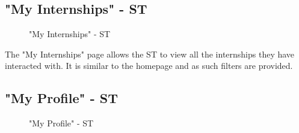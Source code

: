 \subsection{"My Internships" - ST}
\label{subsec:my-internships-st}%

\begin{figure}[H]
    \centering
    \caption{"My Internships" - ST}
    \label{fig:my-internships-st}
\end{figure}

\par The "My Internships" page allows the ST to view all the internships they have interacted with. It is similar to
the homepage and as such filters are provided.

\subsection{"My Profile" - ST}
\label{subsec:profile-st}%

\begin{figure}[H]
    \centering
    \caption{"My Profile" - ST}
    \label{fig:my-profile-st}
\end{figure}


